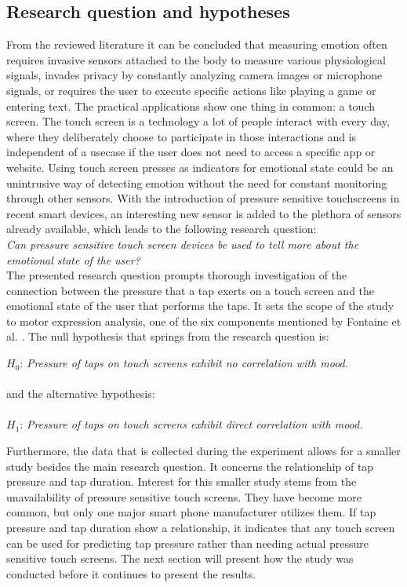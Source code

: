 \documentclass{sigchi}
\begin{document}

\subsection{Research question and hypotheses}
From the reviewed literature it can be concluded that measuring emotion often requires invasive sensors attached to the body to measure various physiological signals, invades privacy by constantly analyzing camera images or microphone signals, or requires the user to execute specific actions like playing a game or entering text. The practical applications show one thing in common: a touch screen. The touch screen is a technology a lot of people interact with every day, where they deliberately choose to participate in those interactions and is independent of a usecase if the user does not need to access a specific app or website. Using touch screen presses as indicators for emotional state could be an unintrusive way of detecting emotion without the need for constant monitoring through other sensors. With the introduction of pressure sensitive touchscreens in recent smart devices, an interesting new sensor is added to the plethora of sensors already available, which leads to the following research question:\\

\textit{Can pressure sensitive touch screen devices be used to tell more about the emotional state of the user?}\\

The presented research question prompts thorough investigation of the connection between the pressure that a tap exerts on a touch screen and the emotional state of the user that performs the taps. It sets the scope of the study to motor expression analysis, one of the six components mentioned by Fontaine et al. \cite{Fontaine2007}. The null hypothesis that springs from the research question is:

$H_0$: \textit{Pressure of taps on touch screens exhibit no correlation with mood.}
\\\\and the alternative hypothesis:\\\\
$H_1$: \textit{Pressure of taps on touch screens exhibit direct correlation with mood.}

Furthermore, the data that is collected during the experiment allows for a smaller study besides the main research question. It concerns the relationship of tap pressure and tap duration. Interest for this smaller study stems from the unavailability of pressure sensitive touch screens. They have become more common, but only one major smart phone manufacturer utilizes them. If tap pressure and tap duration show a relationship, it indicates that any touch screen can be used for predicting tap pressure rather than needing actual pressure sensitive touch screens. The next section will present how the study was conducted before it continues to present the results.
\end{document}
